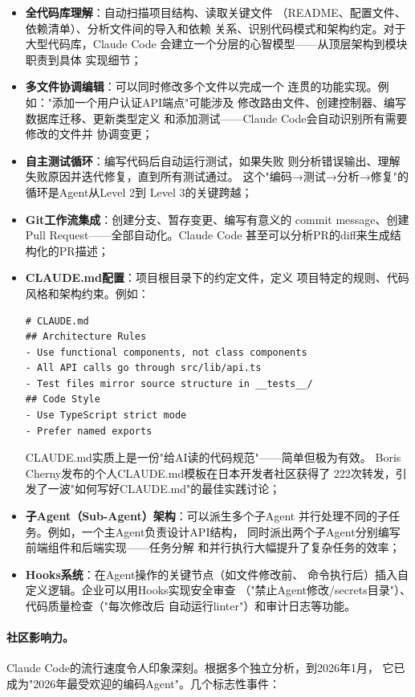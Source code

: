 \begin{itemize}
  \item \textbf{全代码库理解}：自动扫描项目结构、读取关键文件
    （README、配置文件、依赖清单）、分析文件间的导入和依赖
    关系、识别代码模式和架构约定。对于大型代码库，Claude Code
    会建立一个分层的心智模型——从顶层架构到模块职责到具体
    实现细节；
  \item \textbf{多文件协调编辑}：可以同时修改多个文件以完成一个
    连贯的功能实现。例如："添加一个用户认证API端点"可能涉及
    修改路由文件、创建控制器、编写数据库迁移、更新类型定义
    和添加测试——Claude Code会自动识别所有需要修改的文件并
    协调变更；
  \item \textbf{自主测试循环}：编写代码后自动运行测试，如果失败
    则分析错误输出、理解失败原因并迭代修复，直到所有测试通过。
    这个"编码→测试→分析→修复"的循环是Agent从Level 2到
    Level 3的关键跨越；
  \item \textbf{Git工作流集成}：创建分支、暂存变更、编写有意义的
    commit message、创建Pull Request——全部自动化。Claude Code
    甚至可以分析PR的diff来生成结构化的PR描述；
  \item \textbf{CLAUDE.md配置}：项目根目录下的约定文件，定义
    项目特定的规则、代码风格和架构约束。例如：
\begin{verbatim}
# CLAUDE.md
## Architecture Rules
- Use functional components, not class components
- All API calls go through src/lib/api.ts
- Test files mirror source structure in __tests__/
## Code Style
- Use TypeScript strict mode
- Prefer named exports
\end{verbatim}
    CLAUDE.md实质上是一份"给AI读的代码规范"——简单但极为有效。
    Boris Cherny发布的个人CLAUDE.md模板在日本开发者社区获得了
    222次转发，引发了一波"如何写好CLAUDE.md"的最佳实践讨论；
  \item \textbf{子Agent（Sub-Agent）架构}：可以派生多个子Agent
    并行处理不同的子任务。例如，一个主Agent负责设计API结构，
    同时派出两个子Agent分别编写前端组件和后端实现——任务分解
    和并行执行大幅提升了复杂任务的效率；
  \item \textbf{Hooks系统}：在Agent操作的关键节点（如文件修改前、
    命令执行后）插入自定义逻辑。企业可以用Hooks实现安全审查
    （"禁止Agent修改/secrets目录"）、代码质量检查（"每次修改后
    自动运行linter"）和审计日志等功能。
\end{itemize}

\paragraph{社区影响力。}
Claude Code的流行速度令人印象深刻。根据多个独立分析，到2026年1月，
它已成为"2026年最受欢迎的编码Agent"。几个标志性事件：

